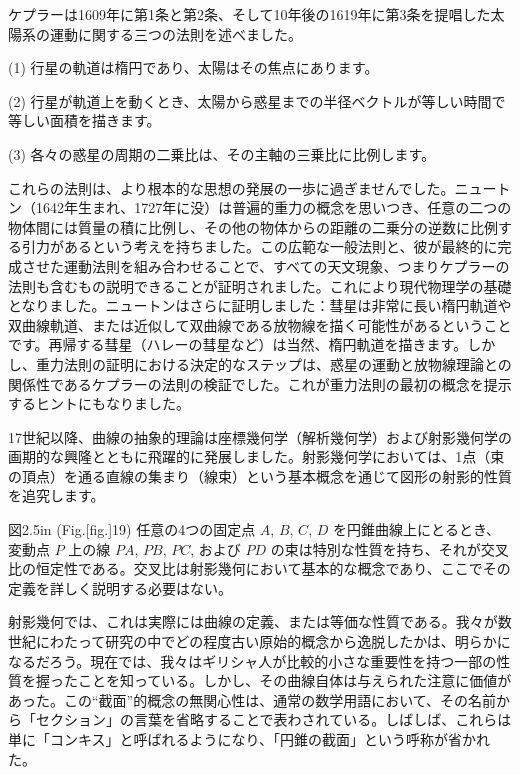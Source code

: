 \documentclass[a4paper,11pt,openany]{ltjsbook}
\begin{document}
ケプラーは1609年に第1条と第2条、そして10年後の1619年に第3条を提唱した太陽系の運動に関する三つの法則を述べました。

(1) 行星の軌道は楕円であり、太陽はその焦点にあります。

(2) 行星が軌道上を動くとき、太陽から惑星までの半径ベクトルが等しい時間で等しい面積を描きます。

(3) 各々の惑星の周期の二乗比は、その主軸の三乗比に比例します。

これらの法則は、より根本的な思想の発展の一歩に過ぎませんでした。ニュートン（1642年生まれ、1727年に没）は普遍的重力の概念を思いつき、任意の二つの物体間には質量の積に比例し、その他の物体からの距離の二乗分の逆数に比例する引力があるという考えを持ちました。この広範な一般法則と、彼が最終的に完成させた運動法則を組み合わせることで、すべての天文現象、つまりケプラーの法則も含むもの説明できることが証明されました。これにより現代物理学の基礎となりました。ニュートンはさらに証明しました：彗星は非常に長い楕円軌道や双曲線軌道、または近似して双曲線である放物線を描く可能性があるということです。再帰する彗星（ハレーの彗星など）は当然、楕円軌道を描きます。しかし、重力法則の証明における決定的なステップは、惑星の運動と放物線理論との関係性であるケプラーの法則の検証でした。これが重力法則の最初の概念を提示するヒントにもなりました。

17世紀以降、曲線の抽象的理論は座標幾何学（解析幾何学）および射影幾何学の画期的な興隆とともに飛躍的に発展しました。射影幾何学においては、1点（束の頂点）を通る直線の集まり（線束）という基本概念を通じて図形の射影的性質を追究します。

図2.5in (Fig.[fig.]{19}) 任意の4つの固定点 $A$, $B$, $C$, $D$ を円錐曲線上にとるとき、変動点 $P$ 上の線 $PA$, $PB$, $PC$, および $PD$ の束は特別な性質を持ち、それが交叉比の恒定性である。交叉比は射影幾何において基本的な概念であり、ここでその定義を詳しく説明する必要はない。

射影幾何では、これは実際には曲線の定義、または等価な性質である。我々が数世紀にわたって研究の中でどの程度古い原始的概念から逸脱したかは、明らかになるだろう。現在では、我々はギリシャ人が比較的小さな重要性を持つ一部の性質を握ったことを知っている。しかし、その曲線自体は与えられた注意に価値があった。この“截面”的概念の無関心性は、通常の数学用語において、その名前から「セクション」の言葉を省略することで表わされている。しばしば、これらは単に「コンキス」と呼ばれるようになり、「円錐の截面」という呼称が省かれた。
\end{document}
